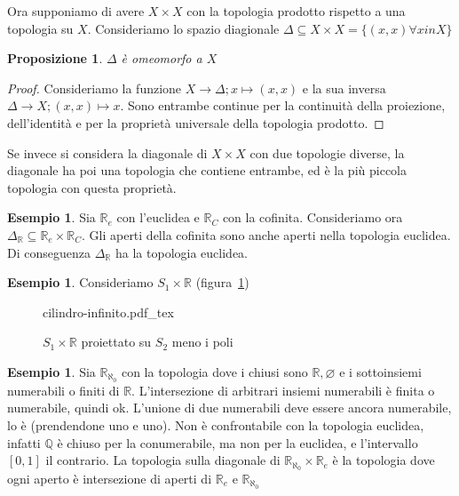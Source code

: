 \documentclass{article}
\newcommand{\incfig}[2][1]{%
    \def\svgwidth{#1\columnwidth}
    {#2.pdf_tex}
}
\newcounter{theo}[section]\setcounter{theo}{0}
\newcounter{excounter}[section]\setcounter{excounter}{0}
\theoremstyle{plain}
\newtheorem{proposition}[theo]{Proposizione}
\theoremstyle{definition}
\newtheorem{example}[excounter]{Esempio}
\theoremstyle{remark}
\begin{document}
Ora supponiamo di avere \(X\times X\) con la topologia prodotto rispetto a una
topologia su \(X\). Consideriamo lo spazio diagionale \(\Delta \subseteq X\times
X = \{(x, x) \forall x in X\} \) 
\begin{proposition}
    \(\Delta\) è omeomorfo a \(X\)
\end{proposition}
\begin{proof}
    Consideriamo la funzione \(X \to \Delta; x \mapsto (x, x)\) e la sua inversa
    \(\Delta \to X; (x, x) \mapsto x\). Sono entrambe continue per la continuità
    della proiezione, dell'identità e per la proprietà universale della
    topologia prodotto.
\end{proof}
Se invece si considera la diagonale di \(X\times X\) con due topologie diverse,
la diagonale ha poi una topologia che contiene entrambe, ed è la più piccola
topologia con questa proprietà.
\begin{example}
    Sia \(\mathbb{R}_e\) con l'euclidea e \(\mathbb{R}_C\) con la cofinita.
    Consideriamo ora \(\Delta_\mathbb{R}\subseteq \mathbb{R}_e \times \mathbb{R}_C \).
    Gli aperti della cofinita sono anche aperti nella topologia euclidea. Di
    conseguenza \(\Delta_ \mathbb{R}\) ha la topologia euclidea.
\end{example}
\begin{example}
    Consideriamo \(S_{1} \times \mathbb{R}\) (figura~\ref{fig:cilindro-infinito})
\end{example}
\begin{figure}[ht]
    \centering
    \incfig[.6]{cilindro-infinito}
    \caption{\(S_{1}\times \mathbb{R}\) proiettato su \(S_2\) meno i poli}
    \label{fig:cilindro-infinito}
\end{figure}
\begin{example}
Sia \(\mathbb{R}_{\aleph_0}\) con la topologia dove i chiusi sono \(\mathbb{R},
\varnothing\) e i sottoinsiemi numerabili o finiti di \(\mathbb{R}\). L'intersezione di
arbitrari insiemi numerabili è finita o numerabile, quindi ok. L'unione di due
numerabili deve essere ancora numerabile, lo è (prendendone uno e uno). Non è
confrontabile con la topologia euclidea, infatti \(\mathbb{Q}\) è chiuso per la
conumerabile, ma non per la euclidea, e l'intervallo \([0, 1]\) il contrario. La
topologia sulla diagonale di \(\mathbb{R}_{\aleph_0} \times \mathbb{R}_e\) è la
topologia dove ogni aperto è intersezione di aperti di \(\mathbb{R}_e\) e
\(\mathbb{R}_{\aleph_0}\) 
\end{example}
\end{document}
